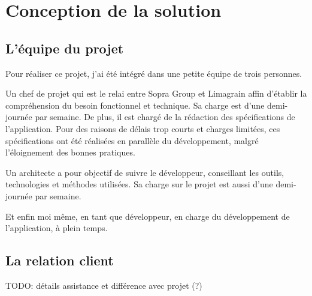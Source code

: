 \cleardoublepage

\chapter{Conception de la solution}


\section{L'équipe du projet}

Pour réaliser ce projet, j'ai été intégré dans une petite équipe de trois personnes.

Un chef de projet qui est le relai entre Sopra Group et Limagrain affin d'établir la compréhension du besoin fonctionnel et technique. Sa charge est d'une demi-journée par semaine. De plus, il est chargé de la rédaction des spécifications de l'application. Pour des raisons de délais trop courts et charges limitées, ces spécifications ont été réalisées en parallèle du développement, malgré l'éloignement des bonnes pratiques.

Un architecte a pour objectif de suivre le développeur, conseillant les outils, technologies et méthodes utilisées. Sa charge sur le projet est aussi d'une demi-journée par semaine.

Et enfin moi même, en tant que développeur, en charge du développement de l'application, à plein temps.


\section{La relation client}

TODO: détails assistance et différence avec projet (?)

